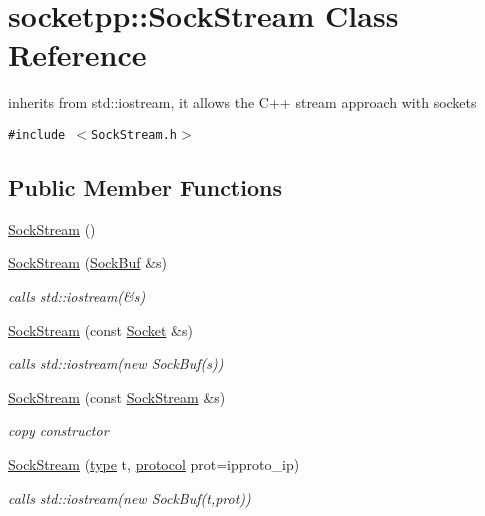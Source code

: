 \hypertarget{classsocketpp_1_1SockStream}{
\section{socketpp::SockStream Class Reference}
\label{classsocketpp_1_1SockStream}
}
inherits from std::iostream, it allows the C++ stream approach with sockets  


{\tt \#include $<$SockStream.h$>$}

\subsection*{Public Member Functions}
\begin{CompactItemize}
\item 
\hyperlink{classsocketpp_1_1SockStream_562a217e536c888c569fde2c9031c94d}{SockStream} ()
\item 
\hyperlink{classsocketpp_1_1SockStream_11fbfc7bda45c178c6e09ac6d67512fd}{SockStream} (\hyperlink{classsocketpp_1_1SockBuf}{SockBuf} \&s)
\begin{CompactList}\small\item\em calls std::iostream(\&s) \item\end{CompactList}\item 
\hyperlink{classsocketpp_1_1SockStream_704f4e77af424bd0638e736653e2d1b3}{SockStream} (const \hyperlink{classsocketpp_1_1Socket}{Socket} \&s)
\begin{CompactList}\small\item\em calls std::iostream(new SockBuf(s)) \item\end{CompactList}\item 
\hyperlink{classsocketpp_1_1SockStream_0310cdd1f212beec6b686d0a549f1788}{SockStream} (const \hyperlink{classsocketpp_1_1SockStream}{SockStream} \&s)
\begin{CompactList}\small\item\em copy constructor \item\end{CompactList}\item 
\hyperlink{classsocketpp_1_1SockStream_4baa8d20dd73480832c7dd9cbad15f75}{SockStream} (\hyperlink{namespacesocketpp_635f4c3b3f85aba331587404d59ae52d}{type} t, \hyperlink{namespacesocketpp_2969678def1c6c8cb4102802ca82e2cf}{protocol} prot=ipproto\_\-ip)
\begin{CompactList}\small\item\em calls std::iostream(new SockBuf(t,prot)) \item\end{CompactList}\item 

\end{CompactItemize}
